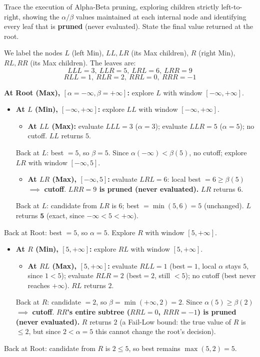 \documentclass[12pt,addpoints]{exam}
\begin{document}
\begin{questions}
\begin{parts}
Trace the execution of Alpha-Beta pruning, exploring children strictly left-to-right, showing the $\alpha/\beta$ values maintained at each internal node and identifying every leaf that is \textbf{pruned} (never evaluated). State the final value returned at the root.

\begin{solution}
We label the nodes $L$ (left Min), $LL,LR$ (its Max children), $R$ (right Min), $RL,RR$ (its Max children). The leaves are:
$$LLL{=}3,\ LLR{=}5,\ LRL{=}6,\ LRR{=}9$$
$$RLL{=}1,\ RLR{=}2,\ RRL{=}0,\ RRR{=}{-1}$$

\textbf{At Root (Max), $[\alpha{=}{-\infty},\beta{=}{+\infty}]$:} explore $L$ with window $[-\infty,+\infty]$.
\begin{itemize}
\item \textbf{At $L$ (Min), $[-\infty,+\infty]$:} explore $LL$ with window $[-\infty,+\infty]$.
    \begin{itemize}
    \item \textbf{At $LL$ (Max):} evaluate $LLL{=}3$ ($\alpha{=}3$); evaluate $LLR{=}5$ ($\alpha{=}5$); no cutoff. $LL$ returns $5$.
    \end{itemize}
    Back at $L$: best $=5$, so $\beta = 5$. Since $\alpha(-\infty) < \beta(5)$, no cutoff; explore $LR$ with window $[-\infty, 5]$.
    \begin{itemize}
    \item \textbf{At $LR$ (Max), $[-\infty,5]$:} evaluate $LRL{=}6$: local best $=6 \ge \beta(5)$ $\implies$ \textbf{cutoff}. \textbf{$LRR=9$ is pruned (never evaluated).} $LR$ returns $6$.
    \end{itemize}
    Back at $L$: candidate from $LR$ is $6$; best $=\min(5,6)=5$ (unchanged). $L$ returns $\mathbf{5}$ (exact, since $-\infty < 5 < +\infty$).
\end{itemize}
Back at Root: best $=5$, so $\alpha = 5$. Explore $R$ with window $[5,+\infty]$.
\begin{itemize}
\item \textbf{At $R$ (Min), $[5,+\infty]$:} explore $RL$ with window $[5,+\infty]$.
    \begin{itemize}
    \item \textbf{At $RL$ (Max), $[5,+\infty]$:} evaluate $RLL{=}1$ (best$=1$, local $\alpha$ stays $5$, since $1<5$); evaluate $RLR{=}2$ (best$=2$, still $<5$); no cutoff (best never reaches $+\infty$). $RL$ returns $2$.
    \end{itemize}
    Back at $R$: candidate $=2$, so $\beta=\min(+\infty,2)=2$. Since $\alpha(5) \ge \beta(2)$ $\implies$ \textbf{cutoff}. \textbf{$RR$'s entire subtree ($RRL=0$, $RRR=-1$) is pruned (never evaluated).} $R$ returns $2$ (a Fail-Low bound: the true value of $R$ is $\le 2$, but since $2 < \alpha = 5$ this cannot change the root's decision).
\end{itemize}
Back at Root: candidate from $R$ is $2 \le 5$, so best remains $\max(5,2)=5$.


\end{solution}
\end{parts}
\end{questions}
\end{document}
